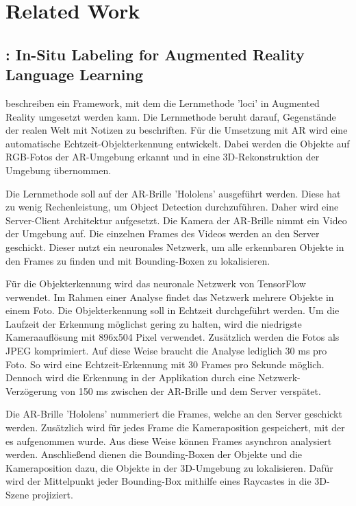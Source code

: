 \section{Related Work}

\subsection{\cite{LabelingLanguageLearning}: In-Situ Labeling for Augmented Reality Language Learning}
\cite{LabelingLanguageLearning} beschreiben ein Framework, mit dem die Lernmethode 'loci' in Augmented Reality umgesetzt werden kann. Die Lernmethode beruht darauf, Gegenstände der realen Welt mit Notizen zu beschriften. Für die Umsetzung mit AR wird eine automatische Echtzeit-Objekterkennung entwickelt. Dabei werden die Objekte auf RGB-Fotos der AR-Umgebung erkannt und in eine 3D-Rekonstruktion der Umgebung übernommen.

Die Lernmethode soll auf der AR-Brille 'Hololens' ausgeführt werden. Diese hat zu wenig Rechenleistung, um Object Detection durchzuführen. Daher wird eine Server-Client Architektur aufgesetzt. Die Kamera der AR-Brille nimmt ein Video der Umgebung auf. Die einzelnen Frames des Videos werden an den Server geschickt. Dieser nutzt ein neuronales Netzwerk, um alle erkennbaren Objekte in den Frames zu finden und mit Bounding-Boxen zu lokalisieren.

Für die Objekterkennung wird das neuronale Netzwerk von TensorFlow verwendet. Im Rahmen einer Analyse findet das Netzwerk mehrere Objekte in einem Foto. Die Objekterkennung soll in Echtzeit durchgeführt werden. Um die Laufzeit der Erkennung möglichst gering zu halten, wird die niedrigste Kameraauflösung mit 896x504 Pixel verwendet. Zusätzlich werden die Fotos als JPEG komprimiert. Auf diese Weise braucht die Analyse lediglich 30 ms pro Foto. So wird eine Echtzeit-Erkennung mit 30 Frames pro Sekunde möglich. Dennoch wird die Erkennung in der Applikation durch eine Netzwerk-Verzögerung von 150 ms zwischen der AR-Brille und dem Server verspätet.

Die AR-Brille 'Hololens' nummeriert die Frames, welche an den Server geschickt werden. Zusätzlich wird für jedes Frame die Kameraposition gespeichert, mit der es aufgenommen wurde. Aus diese Weise können Frames asynchron analysiert werden. Anschließend dienen die Bounding-Boxen der Objekte und die Kameraposition dazu, die Objekte in der 3D-Umgebung zu lokalisieren. Dafür wird der Mittelpunkt jeder Bounding-Box mithilfe eines Raycastes in die 3D-Szene projiziert.

